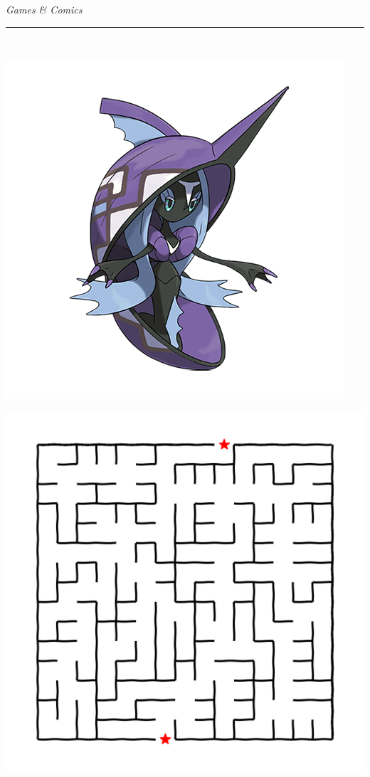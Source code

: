\documentclass[landscape]{article}
\renewcommand\headline[1]{\begin{center} {\huge \textsl{ #1}}\\ %
			\rule[5pt]{0.8\hsize}{0.5pt}\\ \end{center}}
\begin{document}
\begin{multicols}{3}
\clearpage
\headline{Games \& Comics}
\vspace{-0.3cm}
\noindent\begin{minipage}{0.3\linewidth}
\includegraphics[width=\linewidth]{images/pokedex.png}
\end{minipage}
\begin{minipage}{0.71\linewidth}

\end{minipage}
\center\includegraphics[width=\linewidth]{images/maze_j.png}


\end{multicols}
\end{document}
